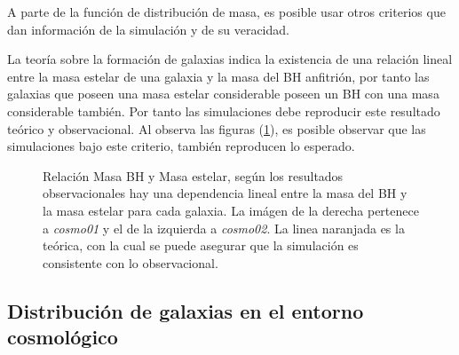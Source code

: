 A parte de la función de distribución de masa, es posible usar otros criterios que dan información de la simulación y de su veracidad. 

La teoría sobre la formación de galaxias indica la existencia de una relación lineal entre la masa estelar de una galaxia y la masa del BH anfitrión, por tanto las galaxias que poseen una masa estelar considerable poseen un BH con una masa considerable también. Por tanto las simulaciones debe reproducir este resultado teórico y observacional. Al observa las figuras (\ref{fig: Mass_bhVsMass_stelar}), es posible observar que las simulaciones bajo este criterio, también reproducen lo esperado. 
%
 \begin{figure}
 \centering
 \caption{Relación Masa BH y Masa estelar, según los resultados observacionales hay una dependencia lineal entre la masa del BH y la masa estelar para cada galaxia. La imágen de la derecha pertenece a {\it{cosmo01}} y el de la izquierda a {\it{cosmo02}}. La linea naranjada es la teórica\cite{McConnell2013}, con la cual se puede asegurar que la simulación es consistente con lo observacional.}
 \label{fig: Mass_bhVsMass_stelar}
\end{figure}
%
    \subsection{ Distribución de galaxias en el entorno cosmológico}
    \label{subsec: Distribucion de galaxias}

